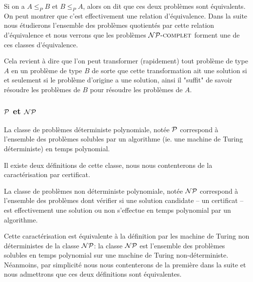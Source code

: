 \documentclass{standalone}
\begin{document}
\begin{defn}
	Si on a $A \leq_P B$ et $B \leq_P A$, alors on dit que ces deux problèmes sont équivalents. On peut montrer que c'est effectivement une relation d'équivalence. Dans la suite nous étudierons l'ensemble des problèmes quotientés par cette relation d'équivalence et nous verrons que les problèmes $\mathcal{NP}\text{\textsc{-complet}}$ forment une de ces classes d'équivalence.
\end{defn}

Cela revient à dire que l'on peut transformer (rapidement) tout problème de type $A$ en un problème de type $B$ de sorte que cette transformation ait une solution si et seulement si le problème d'origine a une solution, ainsi il "suffit" de savoir résoudre les problèmes de $B$ pour résoudre les problèmes de $A$.

\subsubsection{$\mathcal{P}$ et $\mathcal{NP}$}

\begin{defn}
	La classe de problèmes déterministe polynomiale, notée $\mathcal{P}$ correspond à l'ensemble des problèmes solubles par un algorithme (ie. une machine de Turing déterministe) en temps polynomial.
\end{defn}

\begin{defn}
	Il existe deux définitions de cette classe, nous nous contenterons de la caractérisation par certificat.
	
	La classe de problèmes non déterministe polynomiale, notée $\mathcal{NP}$ correspond à l'ensemble des problèmes dont vérifier si une solution candidate -- un certificat -- est effectivement une solution ou non s'effectue en temps polynomial par un algorithme.
	
	Cette caractérisation est équivalente à la définition par les machine de Turing non déterministes de la classe $\mathcal{NP}$: la classe $\mathcal{NP}$ est l'ensemble des problèmes solubles en temps polynomial sur une machine de Turing non-déterministe. Néanmoins, par simplicité nous nous contenterons de la première dans la suite et nous admettrons que ces deux définitions sont équivalentes.
\end{defn}
\end{document}
